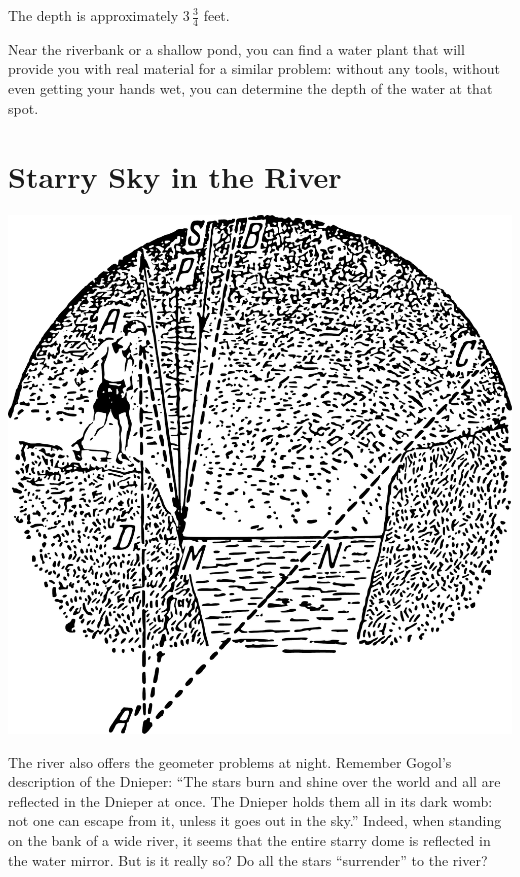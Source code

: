 The depth is approximately $3\,\frac{3}{4}$ feet.

Near the riverbank or a shallow pond, you can find a water plant that will provide you with real material for a similar problem: without any tools, without even getting your hands wet, you can determine the depth of the water at that spot.



\section{Starry Sky in the River}
\label{sec-2.16}
\begin{marginfigure}%
\centering
\includegraphics[width=1.\textwidth]{figures/ch-02/fig-054.pdf}
\end{marginfigure}
The river also offers the geometer problems at night. Remember Gogol's description of the Dnieper: ``The stars burn and shine over the world and all are reflected in the Dnieper at once. The Dnieper holds them all in its dark womb: not one can escape from it, unless it goes out in the sky.'' Indeed, when standing on the bank of a wide river, it seems that the entire starry dome is reflected in the water mirror. But is it really so? Do all the stars ``surrender'' to the river?


